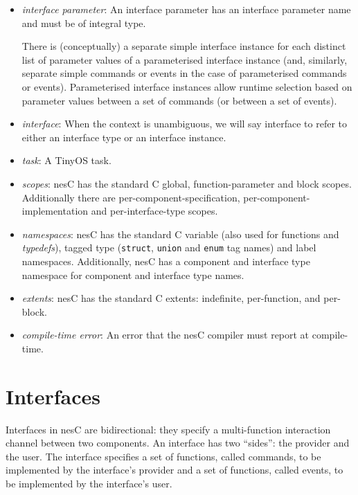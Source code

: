 \documentclass[11pt]{article}
\newcommand{\code}[1]{{\tt #1}}
\newcommand{\nesc}{nesC\xspace}
\begin{document}
\begin{itemize}
\item \emph{interface parameter}: An interface parameter has an interface
parameter name and must be of integral type. 

There is (conceptually) a separate simple interface instance for each
distinct list of parameter values of a parameterised interface instance
(and, similarly, separate simple commands or events in the case of
parameterised commands or events). Parameterised interface instances allow
runtime selection based on parameter values between a set of commands (or
between a set of events).

\item \emph{interface}: When the context is unambiguous, we will say
interface to refer to either an interface type or an interface instance.

\item \emph{task}: A TinyOS task.

\item \emph{scopes}: \nesc has the standard C global, function-parameter
and block scopes. Additionally there are per-component-specification,
per-component-implementation and per-interface-type scopes.

\item \emph{namespaces}: \nesc has the standard C variable (also used for
functions and \emph{typedefs}), tagged type (\code{struct}, \code{union}
and \code{enum} tag names) and label namespaces. Additionally, \nesc has a
component and interface type namespace for component and interface type
names.

\item \emph{extents}: \nesc has the standard C extents: indefinite,
per-function, and per-block.

\item \emph{compile-time error}: An error that the \nesc compiler must
report at compile-time.

\end{itemize}

\section{Interfaces}
\label{sec:interface}

Interfaces in \nesc are bidirectional: they specify a multi-function
interaction channel between two components. An interface has two ``sides'':
the provider and the user. The interface specifies a set of functions,
called commands, to be implemented by the interface's provider and a set of
functions, called events, to be implemented by the interface's
user. 
\end{document}
